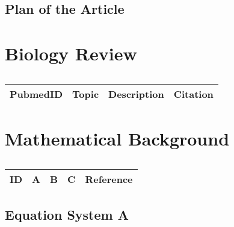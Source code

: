 \subsection{Plan of the Article}

\begin{enumerate}
\end{enumerate}

\section{Biology Review}

\centering	
\begin{table}[H]\tiny
	\caption{}	
	\begin{tabular}{rp{1cm}|p{4cm}|l}
		\hline	
		PubmedID & Topic & Description & Citation \\
		\hline 
		\hline 
	\end{tabular}
\end{table}

\section{Mathematical Background}

\centering
\begin{table}[H]\footnotesize
	\caption{}
	\begin{tabular}{rp{1cm}p{2cm}p{3cm}p{1cm}}
		\hline
		ID & A & B & C & Reference \\
		\hline
		\hline
	\end{tabular}
\end{table}
\raggedright

\subsection{Equation System A}

